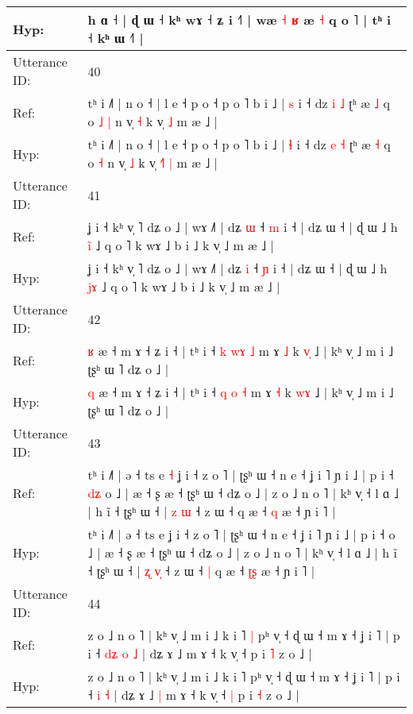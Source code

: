 \documentclass[10pt]{article}
\DeclareRobustCommand{\hl}[1]{{\textcolor{red}{#1}}}
\begin{document}
\begin{longtable}{ll}
 \\
Hyp: & h ɑ ˧ | ɖ ɯ ˧ kʰ wɤ ˧ ʑ i ˧˥ |\hl{}\hl{} wæ \hl{˧} \hl{}\hl{ʁ} æ \hl{˧} q o ˥ | tʰ i ˧ kʰ ɯ ˧˥ |
 \\
\midrule
Utterance ID: & 40 \\
Ref: & tʰ i ˩˥ | n o ˧ | l e ˧ p o ˧ p o ˥ b i ˩ | \hl{s} i ˧ dz \hl{i} \hl{˩} ʈʰ æ \hl{˩} q o\hl{ }\hl{˩} \hl{|} n v̩ \hl{˧} k v̩\hl{}\hl{}\hl{} \hl{˩} m æ ˩ |
 \\
Hyp: & tʰ i ˩˥ | n o ˧ | l e ˧ p o ˧ p o ˥ b i ˩ | \hl{ɬ} i ˧ dz \hl{e} \hl{˧} ʈʰ æ \hl{˧} q o\hl{}\hl{} \hl{˧} n v̩ \hl{˩} k v̩\hl{ }\hl{˧}\hl{˥} \hl{|} m æ ˩ |
 \\
\midrule
Utterance ID: & 41 \\
Ref: & ʝ i ˧ kʰ v̩ ˥ dʑ o ˩ | wɤ ˩˥ | dʑ \hl{ɯ} ˧ \hl{m} i ˧ | dʑ ɯ ˧ | ɖ ɯ ˩ h \hl{i}\hl{̃} ˩ q o ˥ k wɤ ˩ b i ˩ k v̩ ˩ m æ ˩ |
 \\
Hyp: & ʝ i ˧ kʰ v̩ ˥ dʑ o ˩ | wɤ ˩˥ | dʑ \hl{i} ˧ \hl{ɲ} i ˧ | dʑ ɯ ˧ | ɖ ɯ ˩ h \hl{j}\hl{ɤ} ˩ q o ˥ k wɤ ˩ b i ˩ k v̩ ˩ m æ ˩ |
 \\
\midrule
Utterance ID: & 42 \\
Ref: & \hl{ʁ} æ ˧ m ɤ ˧ ʑ i ˧ | tʰ i ˧ \hl{k} \hl{w}\hl{ɤ} \hl{˩} m ɤ \hl{˩} k \hl{v}\hl{̩} ˩ | kʰ v̩ ˩ m i ˩ ʈʂʰ ɯ ˥ dʑ o ˩ |
 \\
Hyp: & \hl{q} æ ˧ m ɤ ˧ ʑ i ˧ | tʰ i ˧ \hl{q} \hl{}\hl{o} \hl{˧} m ɤ \hl{˧} k \hl{w}\hl{ɤ} ˩ | kʰ v̩ ˩ m i ˩ ʈʂʰ ɯ ˥ dʑ o ˩ |
 \\
\midrule
Utterance ID: & 43 \\
Ref: & tʰ i ˩˥ | ə ˧ ts e\hl{ }\hl{˧} ʝ i ˧ z o ˥ | ʈʂʰ ɯ ˧ n e ˧ ʝ i ˥ ɲ i ˩ | p i ˧\hl{ }\hl{d}\hl{ʑ} o ˩ | æ ˧ ʂ æ ˧ ʈʂʰ ɯ ˧ dʑ o ˩ | z o ˩ n o ˥ | kʰ v̩ ˧ l ɑ ˩ | h ĩ ˧ ʈʂʰ ɯ ˧ | \hl{z} \hl{}\hl{ɯ} ˧ z ɯ ˧\hl{}\hl{} q æ ˧ \hl{}\hl{q} æ ˧ ɲ i ˥ |
 \\
Hyp: & tʰ i ˩˥ | ə ˧ ts e\hl{}\hl{} ʝ i ˧ z o ˥ | ʈʂʰ ɯ ˧ n e ˧ ʝ i ˥ ɲ i ˩ | p i ˧\hl{}\hl{}\hl{} o ˩ | æ ˧ ʂ æ ˧ ʈʂʰ ɯ ˧ dʑ o ˩ | z o ˩ n o ˥ | kʰ v̩ ˧ l ɑ ˩ | h ĩ ˧ ʈʂʰ ɯ ˧ | \hl{ʐ} \hl{v}\hl{̩} ˧ z ɯ ˧\hl{ }\hl{|} q æ ˧ \hl{ʈ}\hl{ʂ} æ ˧ ɲ i ˥ |
 \\
\midrule
Utterance ID: & 44 \\
Ref: & z o ˩ n o ˥ | kʰ v̩ ˩ m i ˩ k i ˥\hl{ }\hl{|} pʰ v̩ ˧ ɖ ɯ ˧ m ɤ ˧ ʝ i ˥ | p i ˧\hl{ }\hl{d}\hl{ʑ} \hl{o} \hl{˩} | dʑ ɤ ˩\hl{}\hl{} m ɤ ˧ k v̩ ˧\hl{}\hl{} p i \hl{˥} z o ˩ |
 \\
Hyp: & z o ˩ n o ˥ | kʰ v̩ ˩ m i ˩ k i ˥\hl{}\hl{} pʰ v̩ ˧ ɖ ɯ ˧ m ɤ ˧ ʝ i ˥ | p i ˧\hl{}\hl{}\hl{} \hl{i} \hl{˧} | dʑ ɤ ˩\hl{ }\hl{|} m ɤ ˧ k v̩ ˧\hl{ }\hl{|} p i \hl{˧} z o ˩ |

\end{longtable}
\end{document}
